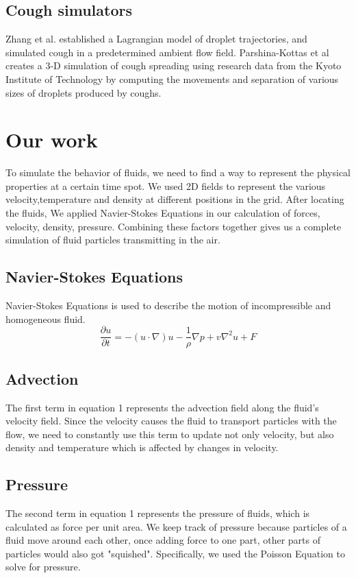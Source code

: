 \documentclass[sigconf]{acmart}
\begin{document}
\subsection{Cough simulators}
Zhang et al. established a Lagrangian model of droplet trajectories, and simulated cough in a predetermined ambient flow field.\cite{Zhang_2017} Parshina-Kottas et al creates a 3-D simulation of cough spreading using research data from the Kyoto Institute of Technology by computing the movements and separation of various sizes of droplets produced by coughs.\cite{Parshina-Kottas}


\section{Our work}

To simulate the behavior of fluids, we need to find a way to represent the physical properties at a certain time spot. We used 2D fields to represent the various velocity,temperature and density at different positions in the grid. After locating the fluids, We applied Navier-Stokes Equations in our calculation of forces, velocity, density, pressure. Combining these factors together gives us a complete simulation of fluid particles transmitting in the air.

\subsection{Navier-Stokes Equations}
Navier-Stokes Equations is used to describe the motion of incompressible and homogeneous fluid.
\begin{equation}
\frac{\partial u}{\partial t} = -(u \cdot \nabla)u - \frac{1}{\rho} \nabla p + v \nabla ^2 u + F
\end{equation}


\subsection{Advection}
The first term in equation 1 represents the advection field along the fluid's velocity field. Since the velocity causes the fluid to transport particles with the flow, we need to constantly use this term to update not only velocity, but also density and temperature which is affected by changes in velocity. 

\subsection{Pressure}
The second term in equation 1 represents the pressure of fluids, which is calculated as force per unit area. We keep track of pressure because particles of a fluid move around each other, once adding force to one part, other parts of particles would also got "squished". Specifically, we used the Poisson Equation to solve for pressure. 
\end{document}
